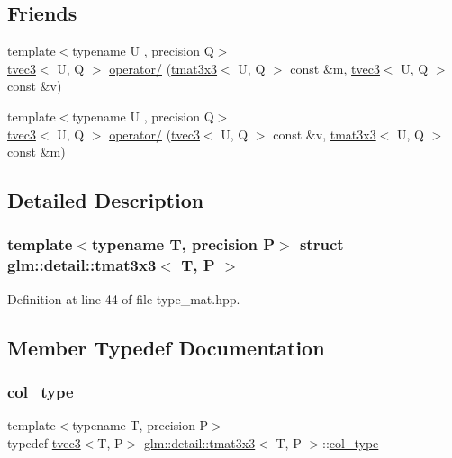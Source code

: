 \subsection*{Friends}
\begin{DoxyCompactItemize}
\item 
{\footnotesize template$<$typename U , precision Q$>$ }\\\hyperlink{structglm_1_1detail_1_1tvec3}{tvec3}$<$ U, Q $>$ \hyperlink{structglm_1_1detail_1_1tmat3x3_ac84f82f1605a6094a397c84daa80a201}{operator/} (\hyperlink{structglm_1_1detail_1_1tmat3x3}{tmat3x3}$<$ U, Q $>$ const \&m, \hyperlink{structglm_1_1detail_1_1tvec3}{tvec3}$<$ U, Q $>$ const \&v)
\item 
{\footnotesize template$<$typename U , precision Q$>$ }\\\hyperlink{structglm_1_1detail_1_1tvec3}{tvec3}$<$ U, Q $>$ \hyperlink{structglm_1_1detail_1_1tmat3x3_a62cedcc444ac62727b8ae82f6b3249b8}{operator/} (\hyperlink{structglm_1_1detail_1_1tvec3}{tvec3}$<$ U, Q $>$ const \&v, \hyperlink{structglm_1_1detail_1_1tmat3x3}{tmat3x3}$<$ U, Q $>$ const \&m)
\end{DoxyCompactItemize}


\subsection{Detailed Description}
\subsubsection*{template$<$typename T, precision P$>$\newline
struct glm\+::detail\+::tmat3x3$<$ T, P $>$}



Definition at line 44 of file type\+\_\+mat.\+hpp.



\subsection{Member Typedef Documentation}
\mbox{\label{structglm_1_1detail_1_1tmat3x3_ad47f3a11bd4333d1103bfa93a86fa54f}} 
\subsubsection{\texorpdfstring{col\+\_\+type}{col\_type}}
{\footnotesize\ttfamily template$<$typename T, precision P$>$ \\
typedef \hyperlink{structglm_1_1detail_1_1tvec3}{tvec3}$<$T, P$>$ \hyperlink{structglm_1_1detail_1_1tmat3x3}{glm\+::detail\+::tmat3x3}$<$ T, P $>$\+::\hyperlink{structglm_1_1detail_1_1tmat3x3_ad47f3a11bd4333d1103bfa93a86fa54f}{col\+\_\+type}}



